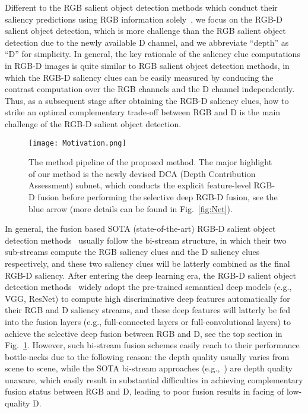 \documentclass[journal]{IEEEtran}
\begin{document}
Different to the RGB salient object detection methods which conduct their saliency predictions using RGB information solely~\cite{CC2019TMM1,CC2015TIP}, we focus on the RGB-D salient object detection, which is more challenge than the RGB salient object detection due to the newly available D channel, and we abbreviate ``depth'' as ``D'' for simplicity.
In general, the key rationale of the saliency clue computations in RGB-D images is quite similar to RGB salient object detection methods, in which the RGB-D saliency clues can be easily measured by conducing the contrast computation over the RGB channels and the D channel independently.
Thus, as a subsequent stage after obtaining the RGB-D saliency clues, how to strike an optimal complementary trade-off between RGB and D is the main challenge of the RGB-D salient object detection.

\begin{figure}[t]
\centering
\texttt{[image: Motivation.png]} \caption{The method pipeline of the proposed method. The major highlight of our method is the newly devised DCA (Depth Contribution Assessment) subnet, which conducts the explicit feature-level RGB-D fusion before performing the selective deep RGB-D fusion, see the blue arrow (more details can be found in Fig.~\ref{fig:Net}).}
\label{fig:motivation}
\end{figure}

In general, the fusion based SOTA (state-of-the-art) RGB-D salient object detection methods~\cite{ren2015exploiting,chen2018progressively,wang2019adaptive,han2018cnns-based,shigematsu2017learning} usually follow the bi-stream structure, in which their two sub-streams compute the RGB saliency clues and the D saliency clues respectively, and these two saliency clues will be latterly combined as the final RGB-D saliency.
After entering the deep learning era, the RGB-D salient object detection methods~\cite{shigematsu2017learning,han2017cnns} widely adopt the pre-trained semantical deep models (e.g., VGG, ResNet) to compute high discriminative deep features automatically for their RGB and D saliency streams, and these deep features will latterly be fed into the fusion layers (e.g., full-connected layers or full-convolutional layers) to achieve the selective deep fusion between RGB and D, see the top section in Fig.~\ref{fig:motivation}.
However, such bi-stream fusion schemes easily reach to their performance bottle-necks due to the following reason:
the depth quality usually varies from scene to scene, while the SOTA bi-stream approaches (e.g.,~\cite{chen2018progressively,wang2019adaptive,han2018cnns-based,shigematsu2017learning}) are depth quality unaware, which easily result in substantial difficulties in achieving complementary fusion status between RGB and D, leading to poor fusion results in facing of low-quality D.
\end{document}
